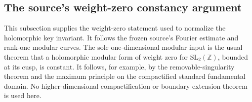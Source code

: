 \subsection{The source's weight-zero constancy argument}
\label{sec:ftb-key-weight-zero}

This subsection supplies the weight-zero statement used to normalize
the holomorphic key invariant.  It follows the frozen source's
Fourier estimate and rank-one modular curves.  The sole
one-dimensional modular input is the usual theorem that a
holomorphic modular form of weight zero for
\(\mathrm{SL}_2(\mathbb Z)\), bounded at its cusp, is constant.
It follows, for example, by the removable-singularity theorem and
the maximum principle on the compactified standard fundamental
domain.  No higher-dimensional compactification or boundary
extension theorem is used here.

